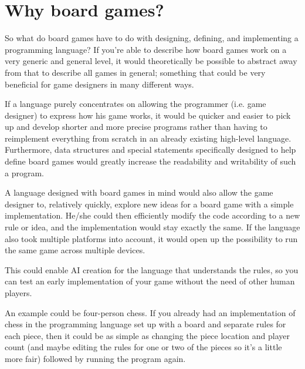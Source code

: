 \section{Why board games?}
So what do board games have to do with designing,
defining, and implementing a programming language?
If you're able to describe how board games work
on a very generic and general level, it would
theoretically be possible to abstract away from
that to describe all games in general; something
that could be very beneficial for game designers
in many different ways.

If a language purely concentrates on allowing the
programmer (i.e. game designer) to express how his
game works, it would be quicker and easier to pick
up and develop shorter and more precise programs
rather than having to reimplement everything
from scratch in an already existing high-level
language. Furthermore, data structures and special
statements specifically designed to help define
board games would greatly increase the readability
and writability of such a program.

A language designed with board games in mind
would also allow the game designer to, relatively
quickly, explore new ideas for a board game
with a simple implementation. He/she could then
efficiently modify the code according to a new
rule or idea, and the implementation would stay
exactly the same. If the language also took
multiple platforms into account, it would open
up the possibility to run the same game across
multiple devices.

This could enable AI creation for the language
that understands the rules, so you can test an
early implementation of your game without the need
of other human players.

An example could be four-person chess. If you
already had an implementation of chess in the
programming language set up with a board and
separate rules for each piece, then it could be as
simple as changing the piece location and player
count (and maybe editing the rules for one or two
of the pieces so it's a little more fair) followed
by running the program again.
